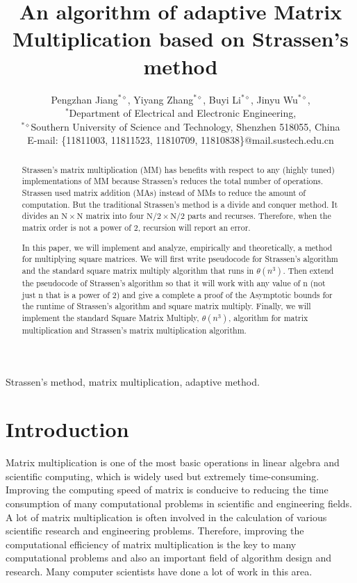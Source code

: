 \documentclass[journal]{IEEEtran}
\begin{document}
\title{{\huge An algorithm of adaptive Matrix Multiplication based on Strassen's method}}
\author{Pengzhan Jiang$^{*\diamond}$, Yiyang Zhang$^{*\diamond}$, Buyi Li$^{*\diamond}$, Jinyu Wu$^{*\diamond}$,\\
        $^{*}$Department of Electrical and Electronic Engineering, \\$^{*\diamond}$Southern University of Science and Technology, Shenzhen 518055, China\\
E-mail: \{11811003, 11811523, 11810709, 11810838\}@mail.sustech.edu.cn
}


\maketitle
\begin{abstract}
 Strassen’s matrix multiplication (MM) has benefits with respect to any (highly tuned) implementations of MM because Strassen’s reduces the total number of operations.
 Strassen used matrix addition (MAs) instead of MMs to reduce the amount of computation.
 But the traditional Strassen's method is a divide and conquer method.
 It divides an $\mathrm{N} \times \mathrm{N}$ matrix into four $\mathrm{N}/2 \times \mathrm{N}/2$ parts and recurses.
 Therefore, when the matrix order is not a power of 2, recursion will report an error.


 In this paper, we will implement and analyze, empirically and theoretically, a method for multiplying square matrices.
 We will first write pseudocode for Strassen’s algorithm and the standard square matrix multiply algorithm that runs in $\theta(n^3)$.
 Then extend the pseudocode of Strassen’s algorithm so that it will work with any value of n (not just n that is a power of 2) and give a complete a proof of the Asymptotic bounds for the runtime of Strassen’s algorithm and square matrix multiply.
 Finally, we will implement the standard Square Matrix Multiply, $\theta(n^3)$, algorithm for matrix multiplication and Strassen’s matrix multiplication algorithm.
\end{abstract}


\begin{IEEEkeywords}
Strassen's method, matrix multiplication, adaptive method.
\end{IEEEkeywords}



\section{Introduction}
Matrix multiplication is one of the most basic operations in linear algebra and scientific computing, which is widely used but extremely time-consuming.
Improving the computing speed of matrix is conducive to reducing the time consumption of many computational problems in scientific and engineering fields.
A lot of matrix multiplication is often involved in the calculation of various scientific research and engineering problems.
Therefore, improving the computational efficiency of matrix multiplication is the key to many computational problems and also an important field of algorithm design and research.
Many computer scientists have done a lot of work in this area.
\end{document}
